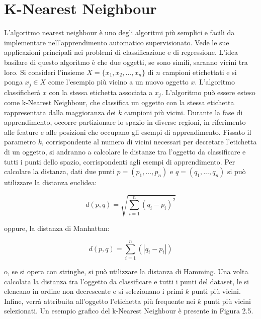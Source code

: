 \documentclass[11pt,  oneside, openany]{book}
\begin{document}
\section{ K-Nearest Neighbour}	
L'algoritmo nearest neighbour è uno degli algoritmi più semplici e facili da implementare nell'apprendimento automatico supervisionato. Vede le sue applicazioni principali nei problemi di classificazione e di regressione. L'idea basilare di questo algoritmo è che due oggetti, se sono simili, saranno vicini tra loro. Si consideri l'insieme $X=\{x_1, x_2, ..., x_n\}$ di $n$ campioni etichettati e si ponga $x_j \in X$ come l'esempio più vicino a un nuovo oggetto $x$. L'algoritmo classificherà $x$ con la stessa etichetta associata a $x_j$. L'algoritmo può essere esteso come  k-Nearest Neighbour, che classifica un oggetto con la stessa etichetta rappresentata dalla maggioranza dei $k$ campioni più vicini. Durante la fase di apprendimento, occorre partizionare lo spazio in diverse regioni, in riferimento alle feature e alle posizioni che occupano gli esempi di apprendimento. Fissato il parametro $k$, corrispondente al numero di vicini necessari per decretare l'etichetta di un oggetto, si andranno a calcolare le distanze tra l'oggetto da classificare e tutti i punti dello spazio, corrispondenti agli esempi di apprendimento. Per calcolare la distanza, dati due punti $ p = (p_1, ..., p_n)$ e $q =  (q_1, ..., q_n)$ si può utilizzare la distanza euclidea:

$$d\left( p,q\right)   = \sqrt {\sum _{i=1}^{n}  \left( q_{i}-p_{i}\right)^2 }$$

\noindent oppure, la distanza di Manhattan: 


$$  d\left( p,q\right) = \sum _{i=1}^{n} \left(|q_{i}-p_{i}|\right)$$


\noindent o, se si opera con stringhe, si può utilizzare la distanza di Hamming. 
Una volta calcolata la distanza tra l'oggetto da classificare e tutti i punti del dataset, le si elencano in ordine non decrescente e si selezionano i primi $k$ punti più vicini. Infine, verrà attribuita all'oggetto l'etichetta più frequente nei $k$ punti più vicini selezionati. 
Un esempio grafico del k-Nearest Neighbour è presente in Figura 2.5. 
\end{document}
